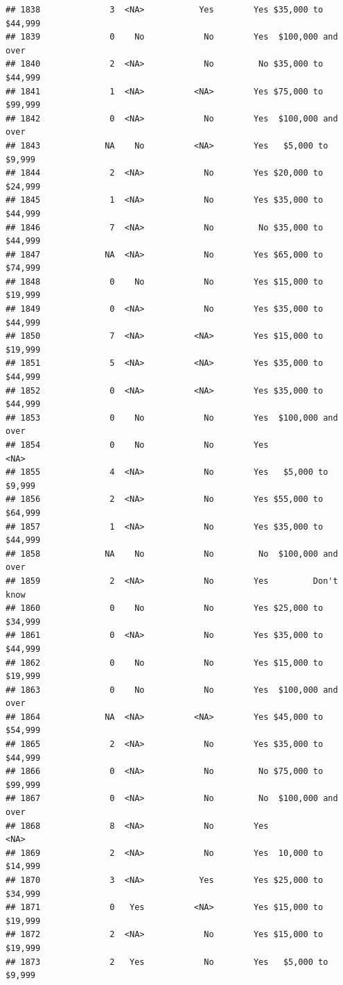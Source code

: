 \documentclass[man]{apa6}
\begin{document}
\begin{verbatim}
## 1838              3  <NA>           Yes        Yes $35,000 to $44,999
## 1839              0    No            No        Yes  $100,000 and over
## 1840              2  <NA>            No         No $35,000 to $44,999
## 1841              1  <NA>          <NA>        Yes $75,000 to $99,999
## 1842              0  <NA>            No        Yes  $100,000 and over
## 1843             NA    No          <NA>        Yes   $5,000 to $9,999
## 1844              2  <NA>            No        Yes $20,000 to $24,999
## 1845              1  <NA>            No        Yes $35,000 to $44,999
## 1846              7  <NA>            No         No $35,000 to $44,999
## 1847             NA  <NA>            No        Yes $65,000 to $74,999
## 1848              0    No            No        Yes $15,000 to $19,999
## 1849              0  <NA>            No        Yes $35,000 to $44,999
## 1850              7  <NA>          <NA>        Yes $15,000 to $19,999
## 1851              5  <NA>          <NA>        Yes $35,000 to $44,999
## 1852              0  <NA>          <NA>        Yes $35,000 to $44,999
## 1853              0    No            No        Yes  $100,000 and over
## 1854              0    No            No        Yes               <NA>
## 1855              4  <NA>            No        Yes   $5,000 to $9,999
## 1856              2  <NA>            No        Yes $55,000 to $64,999
## 1857              1  <NA>            No        Yes $35,000 to $44,999
## 1858             NA    No            No         No  $100,000 and over
## 1859              2  <NA>            No        Yes         Don't know
## 1860              0    No            No        Yes $25,000 to $34,999
## 1861              0  <NA>            No        Yes $35,000 to $44,999
## 1862              0    No            No        Yes $15,000 to $19,999
## 1863              0    No            No        Yes  $100,000 and over
## 1864             NA  <NA>          <NA>        Yes $45,000 to $54,999
## 1865              2  <NA>            No        Yes $35,000 to $44,999
## 1866              0  <NA>            No         No $75,000 to $99,999
## 1867              0  <NA>            No         No  $100,000 and over
## 1868              8  <NA>            No        Yes               <NA>
## 1869              2  <NA>            No        Yes  10,000 to $14,999
## 1870              3  <NA>           Yes        Yes $25,000 to $34,999
## 1871              0   Yes          <NA>        Yes $15,000 to $19,999
## 1872              2  <NA>            No        Yes $15,000 to $19,999
## 1873              2   Yes            No        Yes   $5,000 to $9,999

\end{verbatim}
\end{document}
